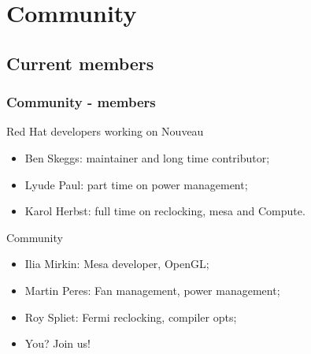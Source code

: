 \documentclass[11pt,english,compress]{beamer}
\begin{document}
\section{Community}

\subsection{Current members}
\begin{frame}
	\frametitle{Community - members}

	\begin{block}{Red Hat developers working on Nouveau}
		\begin{itemize}
			\item Ben Skeggs: maintainer and long time contributor;
			\item Lyude Paul: part time on power management;
			\item Karol Herbst: full time on reclocking, mesa and Compute.
		\end{itemize}
	\end{block}

	\pause

	\begin{block}{Community}
		\begin{itemize}
			\item Ilia Mirkin: Mesa developer, OpenGL;
			\item Martin Peres: Fan management, power management;
			\item Roy Spliet: Fermi reclocking, compiler opts;
			\item You? Join us!
		\end{itemize}
	\end{block}
\end{frame}
\end{document}
